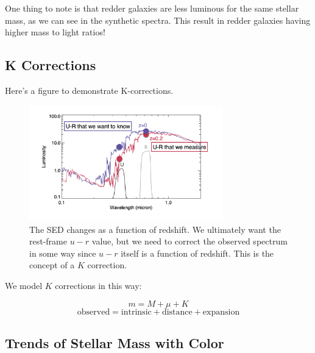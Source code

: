 \documentclass{article}
\begin{document}
One thing to note is that redder galaxies are less luminous for the same stellar mass, as we can see in the synthetic spectra. This result in redder galaxies having higher mass to light ratios! 

\subsection{K Corrections}

Here's a figure to demonstrate K-corrections.

\begin{figure}
    \centering
    \includegraphics[width=0.75\textwidth]{figs/Screen Shot 2021-08-27 at 2.27.30 PM.png}
    \caption{The SED changes as a function of redshift. We ultimately want the rest-frame $u-r$ value, but we need to correct the observed spectrum in some way since $u-r$ itself is a function of redshift. This is the concept of a $K$ correction. }
    \label{fig:k_correc}
\end{figure}

We model $K$ corrections in this way:

\begin{equation}
    m = M + \mu + K
\end{equation}
\begin{equation}
    \text{observed} = \text{intrinsic} + \text{distance} + \text{expansion}
\end{equation}

\subsection{Trends of Stellar Mass with Color}
\end{document}
